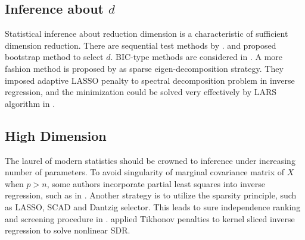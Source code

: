 \subsection{Inference about $d$}

Statistical inference about reduction dimension is a characteristic
of sufficient dimension reduction. There are sequential test methods
by \citet{schott1994determining,velilla1998assessing,bura2001extending,cook2001special,cook2004determining,cook2005sufficient}.
\citet{ye2003using} and \citet{zhu2006fourier} proposed bootstrap
method to select $d$. BIC-type methods are considered in \citet{zhu2006sliced,zhu2007kernel,luo2009contour}.
A more fashion method is proposed by \citet{zhu2010sparse} as sparse
eigen-decomposition strategy. They imposed adaptive LASSO penalty
to spectral decomposition problem in inverse regression, and the minimization
could be solved very effectively by LARS algorithm in \citet{efron2004least}. 


\subsection{High Dimension}

The laurel of modern statistics should be crowned to inference under
increasing number of parameters. To avoid singularity of marginal
covariance matrix of $X$ when $p>n$, some authors incorporate partial
least squares into inverse regression, such as in \citet{li2007partial,cook2007dimension,zhu2009distribution,zhu2010dimension}.
Another strategy is to utilize the sparsity principle, such as LASSO,
SCAD and Dantzig selector. This leads to sure independence ranking
and screening procedure in \citet{zhu2011model}. \citet{wu2008consistency}
applied Tikhonov penalties to kernel sliced inverse regression to
solve nonlinear SDR. %
\begin{comment}
add wuchang bao setting consistency and normalty proof
\end{comment}


